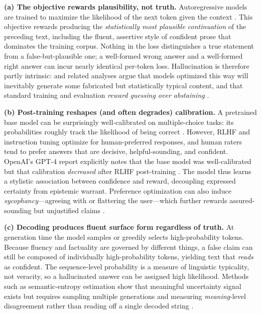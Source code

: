 \documentclass[11pt]{article}
\begin{document}
\textbf{(a) The objective rewards plausibility, not truth.}
Autoregressive models are trained to maximize the likelihood of the next
token given the context \citep{radford2019language,brown2020language}.
This objective rewards producing the \emph{statistically most plausible
continuation} of the preceding text, including the fluent, assertive
style of confident prose that dominates the training corpus. Nothing in
the loss distinguishes a true statement from a false-but-plausible one;
a well-formed wrong answer and a well-formed right answer can incur
nearly identical per-token loss. Hallucination is therefore partly
intrinsic: \citet{kalai2024calibrated} and related analyses argue that
models optimized this way will inevitably generate some fabricated but
statistically typical content, and that standard training and evaluation
\emph{reward guessing over abstaining} \citep{kalai2025hallucinate}.

\textbf{(b) Post-training reshapes (and often degrades) calibration.}
A pretrained base model can be surprisingly well-calibrated on
multiple-choice tasks: its probabilities roughly track the likelihood of
being correct \citep{kadavath2022know}. However, RLHF and instruction
tuning optimize for human-preferred responses, and human raters tend to
prefer answers that are decisive, helpful-sounding, and confident.
OpenAI's GPT-4 report explicitly notes that the base model was
well-calibrated but that calibration \emph{decreased} after RLHF
post-training \citep{openai2023gpt4}. The model thus learns a stylistic
association between confidence and reward, decoupling expressed certainty
from epistemic warrant. Preference optimization can also induce
\emph{sycophancy}---agreeing with or flattering the user---which further
rewards assured-sounding but unjustified claims
\citep{perez2023discovering}.

\textbf{(c) Decoding produces fluent surface form regardless of truth.}
At generation time the model samples or greedily selects high-probability
tokens. Because fluency and factuality are governed by different things,
a false claim can still be composed of individually high-probability
tokens, yielding text that \emph{reads} as confident. The sequence-level
probability is a measure of linguistic typicality, not veracity, so a
hallucinated answer can be assigned high likelihood. Methods such as
semantic-entropy estimation show that meaningful uncertainty signal
exists but requires sampling multiple generations and measuring
\emph{meaning}-level disagreement rather than reading off a single
decoded string \citep{kuhn2023semantic,farquhar2024detecting}.
\end{document}
